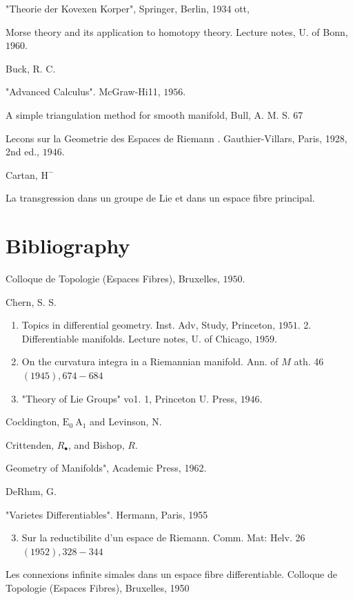 \documentclass[10pt]{article}
\begin{document}
"Theorie der Kovexen Korper", Springer, Berlin, 1934 ott,

Morse theory and its application to homotopy theory. Lecture notes, U. of Bonn, $1960 .$

Buck, R. C.

"Advanced Calculus". McGraw-Hi11, $1956 .$

A simple triangulation method for smooth manifold, Bull, A. M. S. 67

Lecons sur la Geometrie des Espaces de Riemann . Gauthier-Villars, Paris, 1928, 2nd ed., $1946 .$

Cartan, $\mathrm{H}^{-}$

La transgression dans un groupe de Lie et dans un espace fibre principal.

\section{Bibliography}
Colloque de Topologie (Espaces Fibres), Bruxelles, $1950 .$

Chern, S. S.

\begin{enumerate}
  \item Topics in differential geometry. Inst. Adv, Study, Princeton, $1951 .$ 2. Differentiable manifolds. Lecture notes, U. of Chicago, $1959 .$

  \item On the curvatura integra in a Riemannian manifold. Ann. of $M$ ath. 46 $(1945), 674-684$

  \item "Theory of Lie Groups" vo1. 1, Princeton U. Press, $1946 .$

\end{enumerate}
Cocldington, $\mathrm{E}_{0} \mathrm{~A}_{1}$ and Levinson, $\mathrm{N}$.

Crittenden, $R_{\bullet}$, and Bishop, $R .$

Geometry of Manifolds", Academic Press, 1962.

DeRhım, G.

"Varietes Differentiables". Hermann, Paris, 1955

\begin{enumerate}
  \setcounter{enumi}{2}
  \item Sur la reductibilite d'un espace de Riemann. Comm. Mat: Helv. 26 $(1952), 328-344$
\end{enumerate}
Les connexions infinite simales dans un espace fibre differentiable. Colloque de Topologie (Espaces Fibres), Bruxelles, 1950
\end{document}
